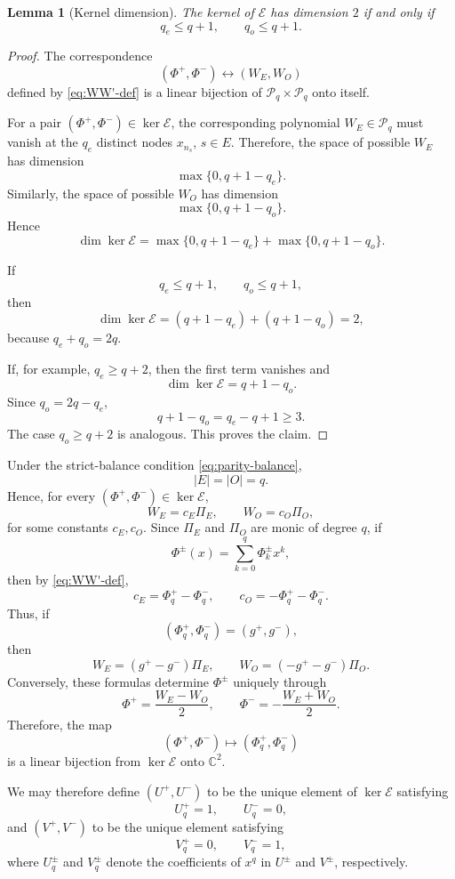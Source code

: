 \documentclass[11pt,a4paper]{article}
\newtheorem{lemma}[theorem]{Lemma}
\theoremstyle{definition}
\begin{document}
\begin{lemma}[Kernel dimension]\label{lem:kerdim}
The kernel of \(\mathcal E\) has dimension \(2\) if and only if
\[
q_e\leq q+1,
\qquad
q_o\leq q+1.
\]
\end{lemma}

\begin{proof}
The correspondence
\[
(\Phi^+,\Phi^-)
\longleftrightarrow
(W_E,W_O)
\]
defined by \eqref{eq:WW'-def} is a linear bijection of
\(\mathcal P_q\times\mathcal P_q\) onto itself.

For a pair \((\Phi^+,\Phi^-)\in\ker\mathcal E\), the corresponding
polynomial \(W_E\in\mathcal P_q\) must vanish at the \(q_e\) distinct
nodes \(x_{n_s}\), \(s\in E\).
Therefore, the space of possible \(W_E\) has dimension
\[
\max\{0,q+1-q_e\}.
\]
Similarly, the space of possible \(W_O\) has dimension
\[
\max\{0,q+1-q_o\}.
\]
Hence
\[
\dim\ker\mathcal E
=
\max\{0,q+1-q_e\}
+
\max\{0,q+1-q_o\}.
\]

If
\[
q_e\leq q+1,
\qquad
q_o\leq q+1,
\]
then
\[
\dim\ker\mathcal E
=
(q+1-q_e)+(q+1-q_o)
=
2,
\]
because \(q_e+q_o=2q\).

If, for example, \(q_e\geq q+2\), then the first term vanishes and
\[
\dim\ker\mathcal E
=
q+1-q_o.
\]
Since \(q_o=2q-q_e\),
\[
q+1-q_o
=
q_e-q+1
\geq3.
\]
The case \(q_o\geq q+2\) is analogous. This proves the claim.
\end{proof}

Under the strict-balance condition \eqref{eq:parity-balance},
\[
|E|=|O|=q.
\]
Hence, for every \((\Phi^+,\Phi^-)\in\ker\mathcal E\),
\[
W_E=c_E\Pi_E,
\qquad
W_O=c_O\Pi_O,
\]
for some constants \(c_E,c_O\). Since \(\Pi_E\) and \(\Pi_O\) are
monic of degree \(q\), if
\[
\Phi^\pm(x)=\sum_{k=0}^q\Phi_k^\pm x^k,
\]
then by \eqref{eq:WW'-def},
\[
c_E=\Phi_q^+-\Phi_q^-,
\qquad
c_O=-\Phi_q^+-\Phi_q^-.
\]
Thus, if
\[
(\Phi_q^+,\Phi_q^-)=(g^+,g^-),
\]
then
\[
W_E=(g^+-g^-)\Pi_E,
\qquad
W_O=(-g^+-g^-)\Pi_O.
\]
Conversely, these formulas determine \(\Phi^\pm\) uniquely through
\[
\Phi^+=\frac{W_E-W_O}{2},
\qquad
\Phi^-=-\frac{W_E+W_O}{2}.
\]
Therefore, the map
\[
(\Phi^+,\Phi^-)\longmapsto(\Phi_q^+,\Phi_q^-)
\]
is a linear bijection from \(\ker\mathcal E\) onto \(\mathbb C^2\).

We may therefore define \((U^+,U^-)\) to be the unique element of
\(\ker\mathcal E\) satisfying
\[
U_q^+=1,
\qquad
U_q^-=0,
\]
and \((V^+,V^-)\) to be the unique element satisfying
\[
V_q^+=0,
\qquad
V_q^-=1,
\]
where \(U_q^\pm\) and \(V_q^\pm\) denote the coefficients of \(x^q\)
in \(U^\pm\) and \(V^\pm\), respectively.
\end{document}
